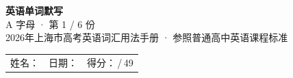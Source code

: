\documentclass[10pt,a4paper]{article}
\begin{document}
\pagestyle{plain}

\begin{center}
{\LARGE\bfseries 英语单词默写}\\[0.22em]
{\large A 字母 · 第 1 / 6 份}\\[0.18em]
{\small 2026年上海市高考英语词汇用法手册 · 参照普通高中英语课程标准}
\end{center}

\vspace{0.25em}
\noindent\begin{tabular}{@{}p{}@{}p{}@{}p{}@{}}
姓名：\underline{\hspace{2.0cm}} & 日期：\underline{\hspace{2.0cm}} & 得分：\underline{\hspace{1.3cm}}\,/\,49 \\
\end{tabular}

\vspace{0.3em}

\vspace{0.08em}
\end{document}
